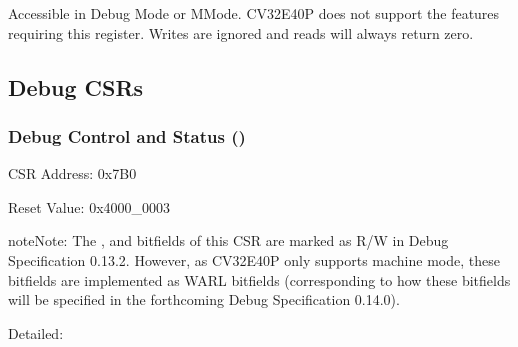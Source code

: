 \documentclass[letterpaper,10pt,english]{sphinxmanual}
\begin{document}
\sphinxAtStartPar
Accessible in Debug Mode or M\sphinxhyphen{}Mode.
CV32E40P does not support the features requiring this register. Writes are ignored and
reads will always return zero.


\subsection{Debug CSRs}
\label{\detokenize{control_status_registers:debug-csrs}}

\subsubsection{Debug Control and Status ()}
\label{\detokenize{control_status_registers:debug-control-and-status-dcsr}}\label{\detokenize{control_status_registers:csr-dcsr}}
\sphinxAtStartPar
CSR Address: 0x7B0

\sphinxAtStartPar
Reset Value: 0x4000\_0003

\begin{sphinxadmonition}{note}{Note:}
\sphinxAtStartPar
The ,  and  bitfields of this CSR are marked as R/W in Debug Specification 0.13.2. However,
as CV32E40P only supports machine mode, these bitfields are implemented as WARL bitfields (corresponding to how these bitfields will
be specified in the forthcoming Debug Specification 0.14.0).
\end{sphinxadmonition}

\sphinxAtStartPar
Detailed:
\end{document}
